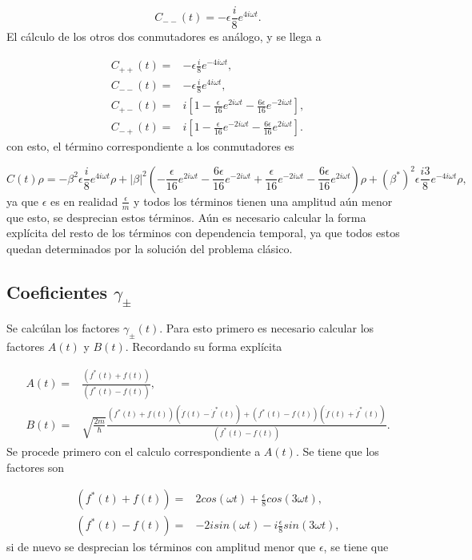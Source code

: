 \documentclass[a4paper,10pt]{report}
\begin{document}
\begin{equation*}
C_{--}(t) = -\epsilon\frac{i}{8}e^{4i\omega t}.
\end{equation*} El cálculo de los otros dos conmutadores es análogo, y se llega a

\begin{align}
C_{++}(t) =& -\epsilon\frac{i}{8}e^{-4i\omega t},\\
C_{--}(t) =& -\epsilon\frac{i}{8}e^{4i\omega t},\\
C_{+-}(t) =& i [1 -\frac{\epsilon}{16}e^{2i\omega t}-\frac{6\epsilon}{16}e^{-2i\omega t}],\\
C_{-+}(t) =& i [1 -\frac{\epsilon}{16}e^{-2i\omega t}-\frac{6\epsilon}{16}e^{2i\omega t}].
\end{align} con esto, el término correspondiente a los conmutadores es

\begin{equation}
C(t)\rho=-\beta^2\epsilon\frac{i}{8}e^{4i\omega t}\rho + |\beta|^2(-\frac{\epsilon}{16}e^{2i\omega t}-\frac{6\epsilon}{16}e^{-2i\omega t} + \frac{\epsilon}{16}e^{-2i\omega t}-\frac{6\epsilon}{16}e^{2i\omega t})\rho +(\beta^*)^2\epsilon\frac{i3}{8}e^{-4i\omega t}\rho,
\end{equation} ya que $\epsilon$ es en realidad $\frac{\epsilon}{m}$ y todos los términos tienen una amplitud aún menor que esto, se desprecian estos términos. Aún es necesario calcular la forma explícita del resto de los términos con dependencia temporal, ya que todos estos quedan determinados por la solución del problema clásico.

\subsection{Coeficientes $\gamma_\pm$}

Se calcúlan los factores $\gamma_{\pm}(t)$. Para esto primero es necesario calcular los factores $A(t)$ y $B(t)$. Recordando su forma explícita

\begin{align}
A(t) =& \frac{(f^* (t) + f(t))}{(f^* (t) - f(t))}, \\
B(t) =& \sqrt{\frac{2m}{\hbar}}\frac{(f^* (t) + f(t))(\dot{f}(t) - \dot{f}^*(t))+(f^* (t) - f(t))(\dot{f}(t) + \dot{f}^* (t))}{(f^* (t) - f(t))}.
\end{align} Se procede primero con el calculo correspondiente a $A(t)$. Se tiene que los factores son

\begin{align*}
(f^* (t) + f(t)) =& 2cos(\omega t) +\frac{\epsilon}{8}cos(3\omega t), \\
(f^* (t) - f(t)) =& -2isin(\omega t) -i\frac{\epsilon}{8}sin(3\omega t),
\end{align*} si de nuevo se desprecian los términos con amplitud menor que $\epsilon$, se tiene que
\end{document}
